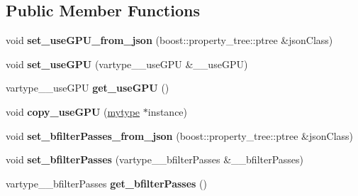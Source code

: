 \subsection*{Public Member Functions}
\begin{DoxyCompactItemize}
\item 
\mbox{\label{classfilter_1_1algos_1_1_i_d_plate_cropper_a58946dadd862be0ab9df163c27e8e4a2}} 
void {\bfseries set\+\_\+use\+G\+P\+U\+\_\+from\+\_\+json} (boost\+::property\+\_\+tree\+::ptree \&json\+Class)
\item 
\mbox{\label{classfilter_1_1algos_1_1_i_d_plate_cropper_aa85b6c55f8363fbca1ea32eceaf1f52a}} 
void {\bfseries set\+\_\+use\+G\+PU} (vartype\+\_\+\+\_\+use\+G\+PU \&\+\_\+\+\_\+use\+G\+PU)
\item 
\mbox{\label{classfilter_1_1algos_1_1_i_d_plate_cropper_a62f7abdafc518e5536b1f87381bb7f67}} 
vartype\+\_\+\+\_\+use\+G\+PU {\bfseries get\+\_\+use\+G\+PU} ()
\item 
\mbox{\label{classfilter_1_1algos_1_1_i_d_plate_cropper_a20ae81c7b13f2667f1764a8dd18de342}} 
void {\bfseries copy\+\_\+use\+G\+PU} (\hyperlink{classfilter_1_1algos_1_1_i_d_plate_cropper}{mytype} $\ast$instance)
\item 
\mbox{\label{classfilter_1_1algos_1_1_i_d_plate_cropper_a4f80adf95c51d81697ebe16ee4e1b4d6}} 
void {\bfseries set\+\_\+bfilter\+Passes\+\_\+from\+\_\+json} (boost\+::property\+\_\+tree\+::ptree \&json\+Class)
\item 
\mbox{\label{classfilter_1_1algos_1_1_i_d_plate_cropper_a63825b6bcf0e9b8eb461b6d655810869}} 
void {\bfseries set\+\_\+bfilter\+Passes} (vartype\+\_\+\+\_\+bfilter\+Passes \&\+\_\+\+\_\+bfilter\+Passes)
\item 
\mbox{\label{classfilter_1_1algos_1_1_i_d_plate_cropper_a54577939e0972053ca5d93411d876052}} 
vartype\+\_\+\+\_\+bfilter\+Passes {\bfseries get\+\_\+bfilter\+Passes} ()
\item 

\end{DoxyCompactItemize}
